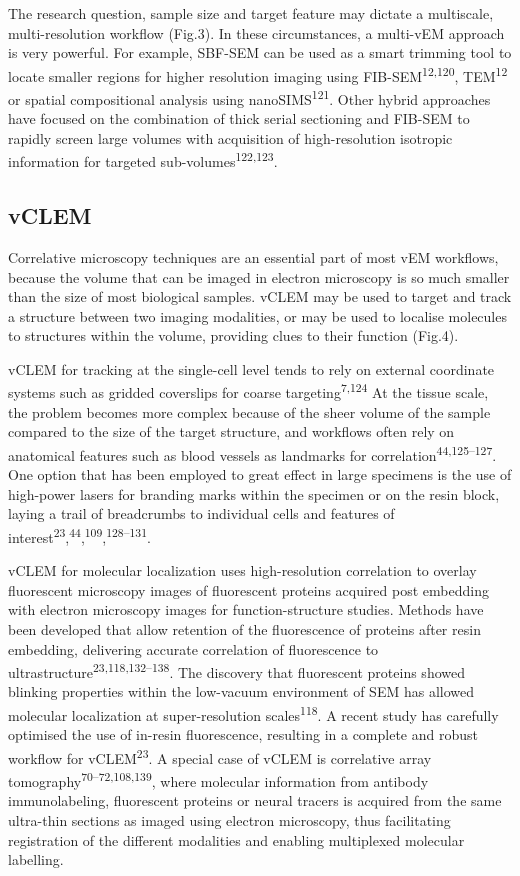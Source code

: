\documentclass{article}
\begin{document}
The research question, sample size and target feature may dictate a multiscale, multi-resolution workflow (Fig.3). In these circumstances, a multi-vEM approach is very powerful. For example, SBF-SEM can be used as a smart trimming tool to locate smaller regions for higher resolution imaging using FIB-SEM\textsuperscript{12,120}, TEM\textsuperscript{12} or spatial compositional analysis using nanoSIMS\textsuperscript{121}. Other hybrid approaches have focused on the combination of thick serial sectioning and FIB-SEM to rapidly screen large volumes with acquisition of high-resolution isotropic information for targeted sub-volumes\textsuperscript{122,123}.

\subsection*{vCLEM}

Correlative microscopy techniques are an essential part of most vEM workflows, because the volume that can be imaged in electron microscopy is so much smaller than the size of most biological samples. vCLEM may be used to target and track a structure between two imaging modalities, or may be used to localise molecules to structures within the volume, providing clues to their function (Fig.4).

vCLEM for tracking at the single-cell level tends to rely on external coordinate systems such as gridded coverslips for coarse targeting\textsuperscript{7,124} At the tissue scale, the problem becomes more complex because of the sheer volume of the sample compared to the size of the target structure, and workflows often rely on anatomical features such as blood vessels as landmarks for correlation\textsuperscript{44,125–127}. One option that has been employed to great effect in large specimens is the use of high-power lasers for branding marks within the specimen or on the resin block, laying a trail of breadcrumbs to individual cells and features of interest\textsuperscript{23},\textsuperscript{44},\textsuperscript{109},\textsuperscript{128–131}.

vCLEM for molecular localization uses high-resolution correlation to overlay fluorescent microscopy images of fluorescent proteins acquired post embedding with electron microscopy images for function-structure studies. Methods have been developed that allow retention of the fluorescence of proteins after resin embedding, delivering accurate correlation of fluorescence to ultrastructure\textsuperscript{23,118,132–138}. The discovery that fluorescent proteins showed blinking properties within the low-vacuum environment of SEM has allowed molecular localization at super-resolution scales\textsuperscript{118}. A recent study has carefully optimised the use of in-resin fluorescence, resulting in a complete and robust workflow for vCLEM\textsuperscript{23}. A special case of vCLEM is correlative array tomography\textsuperscript{70–72,108,139}, where molecular information from antibody immunolabeling, fluorescent proteins or neural tracers is acquired from the same ultra-thin sections as imaged using electron microscopy, thus facilitating registration of the different modalities and enabling multiplexed molecular labelling.
\end{document}
